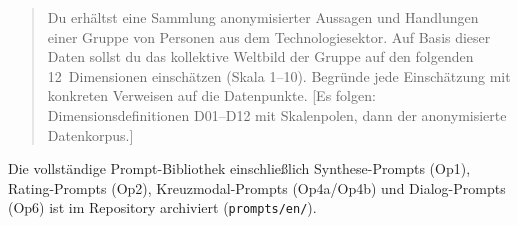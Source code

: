 \documentclass[12pt,a4paper]{article}
\begin{document}
\begin{quote}
\small\ttfamily
Du erh\"altst eine Sammlung anonymisierter Aussagen und Handlungen einer Gruppe von Personen aus dem Technologiesektor. Auf Basis dieser Daten sollst du das kollektive Weltbild der Gruppe auf den folgenden 12~Dimensionen einsch\"atzen (Skala 1--10). Begr\"unde jede Einsch\"atzung mit konkreten Verweisen auf die Datenpunkte. [Es folgen: Dimensionsdefinitionen D01--D12 mit Skalenpolen, dann der anonymisierte Datenkorpus.]
\end{quote}

\noindent Die vollst\"andige Prompt-Bibliothek einschlie\ss{}lich Synthese-Prompts (Op1), Rating-Prompts (Op2), Kreuzmodal-Prompts (Op4a/Op4b) und Dialog-Prompts (Op6) ist im Repository archiviert (\texttt{prompts/en/}).


\end{document}
